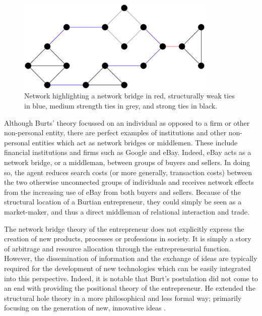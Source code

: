 \begin{figure}[h!]
\centering
\includegraphics[width=0.85\textwidth]{Images/networkbridge.png}
\caption[Strong ties, weak ties, and network bridges]{Network highlighting a network bridge in red, structurally weak ties in blue, medium strength ties in grey, and strong ties in black.}
\label{fig:networkbridge}
\end{figure}

Although Burts' theory focussed on an individual as opposed to a firm or other non-personal entity, there are perfect examples of institutions and other non-personal entities which act as network bridges or middlemen. These include financial institutions and firms such as Google and eBay. Indeed, eBay acts as a network bridge, or a middleman, between groups of buyers and sellers. In doing so, the agent reduces search costs (or more generally, transaction costs) between the two otherwise unconnected groups of individuals and receives network effects from the increasing use of eBay from both buyers and sellers. Because of the structural location of a Burtian entrepreneur, they could simply be seen as a market-maker, and thus a direct middleman of relational interaction and trade.

The network bridge theory of the entrepreneur does not explicitly express the creation of new products, processes or professions in society. It is simply a story of arbitrage and resource allocation through the entrepreneurial function. However, the dissemination of information and the exchange of ideas are typically required for the development of new technologies which can be easily integrated into this perspective. Indeed, it is notable that Burt's postulation did not come to an end with providing the positional theory of the entrepreneur. He extended the structural hole theory in a more philosophical and less formal way; primarily focusing on the generation of new, innovative ideas \citep{Burt2004}.

